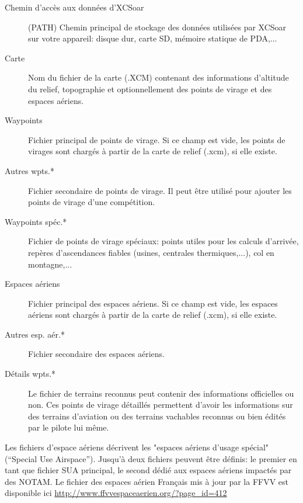 \begin{description}
\item[Chemin d'accès aux données d'XCSoar]  (PATH) Chemin principal de stockage des données utilisées par XCSoar sur votre appareil: disque dur, carte SD, mémoire statique de PDA,...
\item[Carte]  Nom du fichier de la carte (.XCM) contenant des informations d'altitude du relief, topographie et optionnellement des points de virage et des espaces aériens.
\item[Waypoints]  Fichier principal de points de virage. Si ce champ est vide, les points de virages sont chargés à partir de la carte de relief (.xcm), si elle existe.
\item[Autres wpts.*]  Fichier secondaire de points de virage. Il peut être utilisé pour ajouter les points de virage d'une compétition.
\item[Waypoints spéc.*]  Fichier de points de virage spéciaux: points utiles pour les calculs d'arrivée, repères d'ascendances fiables (usines, centrales thermiques,...), col en montagne,...
\item[Espaces aériens] Fichier principal des espaces aériens. Si ce champ est vide, les espaces aériens sont chargés à partir de la carte de relief (.xcm), si elle existe.
\item[Autres esp. aér.*]  Fichier secondaire des espaces aériens.
\item[Détails wpts.*]  Le fichier de terrains reconnus peut contenir des informations officielles ou non. Ces points de virage détaillés permettent d'avoir les informations sur des terrains d'aviation ou des terrains vachables reconnus ou bien édités par le pilote lui même.
\end{description}

Les fichiers d'espace aériens décrivent les "espaces aériens d'usage spécial" (“Special Use Airspace”). Jusqu'à deux fichiers peuvent être définis: le premier en tant que fichier SUA principal, le second dédié aux espaces aériens impactés par des NOTAM. 
Le fichier des espaces aérien Français mis à jour par la FFVV est disponible ici \url{http://www.ffvvespaceaerien.org/?page_id=412}

